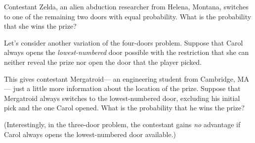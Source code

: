 \documentclass[12pt,twoside]{article}
\begin{document}
\begin{problem}
\ppart 
Contestant Zelda, an alien abduction researcher from Helena,
Montana, switches to one of the remaining two doors with equal
probability.  What is the probability that she wins the prize?



\ppart
Let's consider another variation of the four-doors problem.  Suppose
that Carol always opens the \textit{lowest-numbered} door possible
with the restriction that she can neither reveal the prize nor open
the door that the player picked.

This gives contestant Mergatroid--- an engineering student from
Cambridge, MA--- just a little more information about the location of
the prize.  Suppose that Mergatroid always switches to the
lowest-numbered door, excluding his initial pick and the one Carol
opened.  What is the probability that he wins the prize?

(Interestingly, in the three-door problem, the contestant gains
\textit{no} advantage if Carol always opens the lowest-numbered door
available.)  



\eparts

\end{problem}



\end{document}
